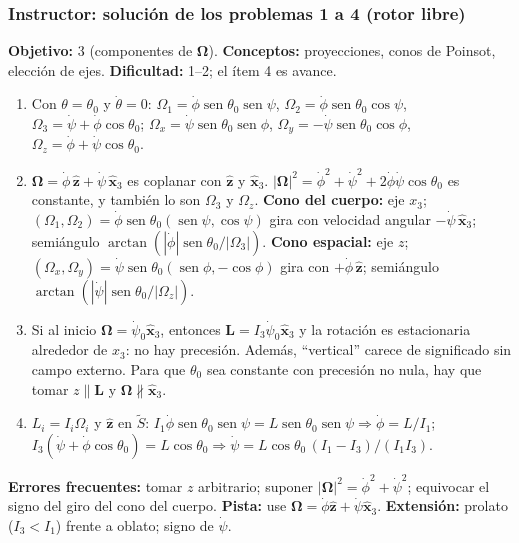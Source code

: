\documentclass[spanish]{beamer}
\providecommand{\sen}{\operatorname{sen}}       %
\newcommand{\vect}[1]{\mathbf{#1}}              %
\newcommand{\uv}[1]{\hat{\mathbf{#1}}}          %
\newcommand{\bOmega}{\bm{\Omega}}               %
\newcommand{\Scue}{\tilde{S}}                   %
\begin{document}
\begin{frame}
  \frametitle{Instructor: solución de los problemas 1 a 4 (rotor libre)}
  \footnotesize
  \textbf{Objetivo:} 3 (componentes de $\bOmega$). \textbf{Conceptos:} proyecciones,
  conos de Poinsot, elección de ejes. \textbf{Dificultad:} 1–2; el ítem 4 es avance.
  \begin{enumerate}
    \item Con $\theta=\theta_0$ y $\dot\theta=0$:
      $\Omega_1=\dot\phi\sen\theta_0\sen\psi$, $\Omega_2=\dot\phi\sen\theta_0\cos\psi$,
      $\Omega_3=\dot\psi+\dot\phi\cos\theta_0$;\;
      $\Omega_x=\dot\psi\sen\theta_0\sen\phi$, $\Omega_y=-\dot\psi\sen\theta_0\cos\phi$,
      $\Omega_z=\dot\phi+\dot\psi\cos\theta_0$.
    \item $\bOmega=\dot\phi\,\uv{z}+\dot\psi\,\uv{x}_3$ es coplanar con $\uv{z}$ y
      $\uv{x}_3$. $|\bOmega|^2=\dot\phi^2+\dot\psi^2+2\dot\phi\dot\psi\cos\theta_0$
      es constante, y también lo son $\Omega_3$ y $\Omega_z$.
      \textbf{Cono del cuerpo:} eje $x_3$; $(\Omega_1,\Omega_2)=\dot\phi\sen\theta_0(\sen\psi,\cos\psi)$
      gira con velocidad angular $-\dot\psi\,\uv{x}_3$; semiángulo
      $\arctan(|\dot\phi|\sen\theta_0/|\Omega_3|)$.
      \textbf{Cono espacial:} eje $z$; $(\Omega_x,\Omega_y)=\dot\psi\sen\theta_0(\sen\phi,-\cos\phi)$
      gira con $+\dot\phi\,\uv{z}$; semiángulo $\arctan(|\dot\psi|\sen\theta_0/|\Omega_z|)$.
    \item Si al inicio $\bOmega=\dot\psi_0\uv{x}_3$, entonces $\vect{L}=I_3\dot\psi_0\uv{x}_3$
      y la rotación es estacionaria alrededor de $x_3$: no hay precesión. Además,
      ``vertical'' carece de significado sin campo externo. Para que $\theta_0$ sea
      constante con precesión no nula, hay que tomar $z\parallel\vect{L}$ y
      $\bOmega\not\parallel\uv{x}_3$.
    \item $L_i=I_i\Omega_i$ y $\uv{z}$ en $\Scue$:
      $I_1\dot\phi\sen\theta_0\sen\psi=L\sen\theta_0\sen\psi\Rightarrow\dot\phi=L/I_1$;\;
      $I_3(\dot\psi+\dot\phi\cos\theta_0)=L\cos\theta_0\Rightarrow
      \dot\psi=L\cos\theta_0\,(I_1-I_3)/(I_1I_3)$.
  \end{enumerate}
  \textbf{Errores frecuentes:} tomar $z$ arbitrario; suponer
  $|\bOmega|^2=\dot\phi^2+\dot\psi^2$; equivocar el signo del giro del cono del cuerpo.
  \textbf{Pista:} use $\bOmega=\dot\phi\uv{z}+\dot\psi\uv{x}_3$.
  \textbf{Extensión:} prolato ($I_3<I_1$) frente a oblato; signo de $\dot\psi$.
\end{frame}
\end{document}
